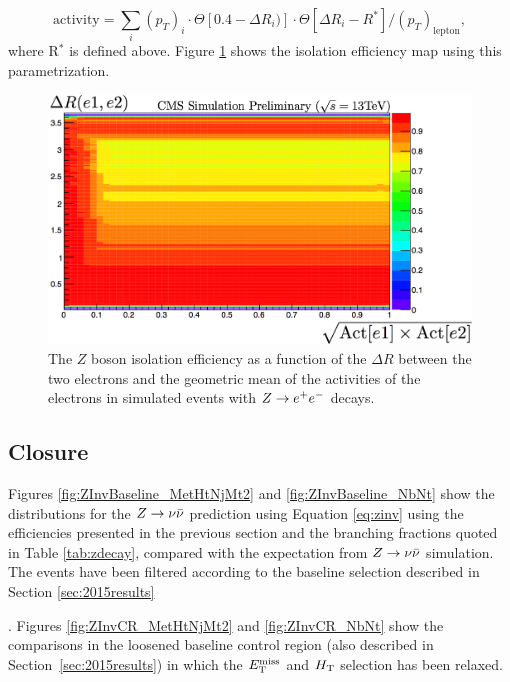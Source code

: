 {\begin{equation}
\text{activity} = \sum_{i}(p_{T})_i \cdot \Theta[0.4-\Delta R_{i})] \cdot \Theta[\Delta R_{i}-R^*]/(p_T)_{\text{lepton}},
\end{equation}
where R$^*$ is defined above.
Figure \ref{fig:ZeeIsolation} shows the isolation efficiency map using this parametrization. 
\begin{figure}[h]
\centering
\includegraphics[width=0.7\linewidth]{figures/SusySearches/HadStop2015/ZeeIsolation.png}
\caption{The $Z$ boson isolation efficiency as a function of the $\Delta R$ between the two electrons and the geometric mean of the activities of the electrons in simulated events with $Z\rightarrow e^+e^-$ decays.}
\label{fig:ZeeIsolation}
\end{figure}
\FloatBarrier

\subsection{Closure}
Figures \ref{fig:ZInvBaseline_MetHtNjMt2} and \ref{fig:ZInvBaseline_NbNt} show the distributions for the $Z\rightarrow \nu\bar{\nu}$ prediction using Equation \ref{eq:zinv} using the efficiencies presented in the previous section and the branching fractions quoted in Table \ref{tab:zdecay}, compared with the expectation from $Z\rightarrow \nu\bar{\nu}$ simulation. The events have been filtered according to the baseline selection described in Section \ref{sec:2015results}}. Figures \ref{fig:ZInvCR_MetHtNjMt2} and \ref{fig:ZInvCR_NbNt} show the comparisons in the loosened baseline control region (also described in Section~\ref{sec:2015results}) in which the $E_{\text{T}}^{\rm miss}$ and $H_{\rm T}$ selection has been relaxed.
